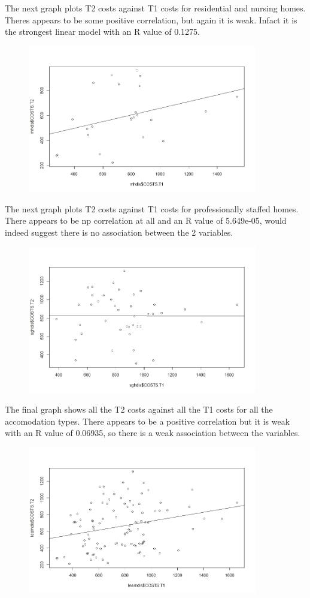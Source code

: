 \documentclass[]{article}
\begin{document}
The next graph plots T2 costs against T1 costs for residential and nursing homes. Theres appears to be some positive correlation, but again it is weak. Infact it is the strongest linear model with an R value of 0.1275.
\begin{figure}[H]
\centering
\includegraphics[width=10cm]{RStudio/jpeg/Reg_RNH.jpeg}
\end{figure}
The next graph plots T2 costs against T1 costs for professionally staffed homes. There appears to be np correlation at all and an R value of 5.649e-05, would indeed suggest there is no association between the 2 variables.
\begin{figure}[H]
\centering
\includegraphics[width=10cm]{RStudio/jpeg/Reg_SGH.jpeg}
\end{figure}
The final graph shows all the T2 costs against all the T1 costs for all the accomodation types. There appears to be a positive correlation but it is weak with an R value of 0.06935, so there is a weak association between the variables.
\begin{figure}[H]
\centering
\includegraphics[width=10cm]{RStudio/jpeg/Reg_COST.jpeg}
\end{figure}
\end{document}
